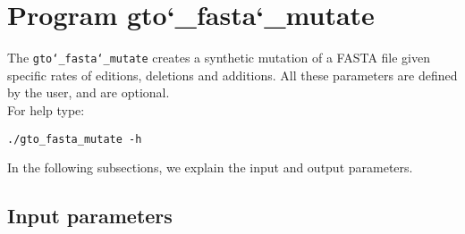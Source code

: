 \section{Program gto\char`_fasta\char`_mutate}
The \texttt{gto\char`_fasta\char`_mutate} creates a synthetic mutation of a FASTA file given specific rates of editions, deletions and additions. All these parameters are defined by the user, and are optional.\\
For help type:
\begin{lstlisting}
./gto_fasta_mutate -h
\end{lstlisting}
In the following subsections, we explain the input and output parameters.

\subsection*{Input parameters}

